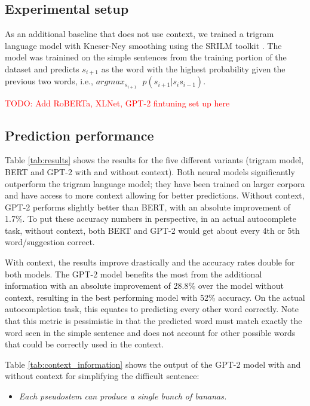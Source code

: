 \documentclass[11pt]{article}
\newcommand{\todo}[1]{\textcolor{red}{TODO: #1}}
\begin{document}
\subsection{Experimental setup}



As an additional baseline that does not use context, we trained a trigram language model with Kneser-Ney smoothing using the SRILM toolkit \cite{stolcke2002srilm}.  The model was trainined on the simple sentences from the training portion of the dataset and predicts $s_{i+1}$ as the word with the highest probability given the previous two words, i.e., $argmax_{s_{i+1}}\mbox{ } p(s_{i+1}| s_i s_{i-1})$.



\todo{Add RoBERTa, XLNet, GPT-2 fintuning set up here}

\subsection{Prediction performance}
Table \ref{tab:results} shows the results for the five different variants (trigram model, BERT and GPT-2 with and without context).  Both neural models significantly outperform the trigram language model; they have been trained on larger corpora and have access to more context allowing for better predictions.  Without context, GPT-2 performs slightly better than BERT, with an absolute improvement of 1.7\%.  To put these accuracy numbers in perspective, in an actual autocomplete task, without context, both BERT and GPT-2 would get about every 4th or 5th word/suggestion correct.

With context, the results improve drastically and the accuracy rates double for both models.  The GPT-2 model benefits the most from the additional information with an absolute improvement of 28.8\% over the model without context, resulting in the best performing model with 52\% accuracy.  On the actual autocompletion task, this equates to predicting every other word correctly.  Note that this metric is pessimistic in that the predicted word must match exactly the word seen in the simple sentence and does not account for other possible words that could be correctly used in the context.

Table \ref{tab:context_information} shows the output of the GPT-2 model with and without context for simplifying the difficult sentence:

\begin{itemize}
    \item[] \textit{Each pseudostem can produce a single bunch of bananas.}
\end{itemize}
\end{document}
